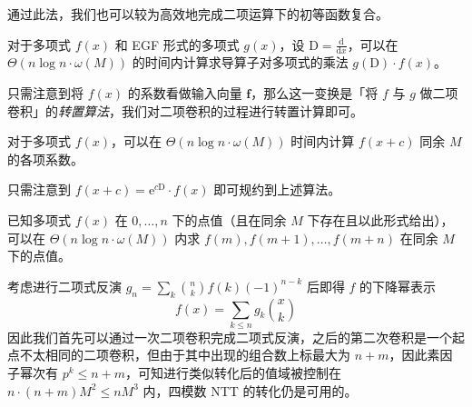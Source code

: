 通过此法，我们也可以较为高效地完成二项运算下的初等函数复合。

\begin{theorem}
对于多项式 $f(x)$ 和 EGF 形式的多项式 $g(x)$，设 $\mathrm{D} = \frac{\mathrm{d}}{\mathrm{d}x}$，可以在 $\Theta(n\log n \cdot \omega(M))$ 的时间内计算求导算子对多项式的乘法 $g(\mathrm{D}) \cdot f(x)$。
\end{theorem}

只需注意到将 $f(x)$ 的系数看做输入向量 $\mathbf f$，那么这一变换是「将 $f$ 与 $g$ 做二项卷积」的\emph{转置算法}，我们对二项卷积的过程进行转置计算即可。

\begin{lemma}
对于多项式 $f(x)$，可以在 $\Theta(n\log n \cdot \omega(M))$ 时间内计算 $f(x+c)$ 同余 $M$ 的各项系数。
\end{lemma}

只需注意到 $f(x+c) = \mathrm{e}^{c\mathrm{D}} \cdot f(x)$ 即可规约到上述算法。

\begin{lemma}
已知多项式 $f(x)$ 在 $0,\dots,n$ 下的点值（且在同余 $M$ 下存在且以此形式给出），可以在 $\Theta(n\log n \cdot \omega (M))$ 内求 $f(m),f(m+1),\dots,f(m+n)$ 在同余 $M$ 下的点值。
\end{lemma}

考虑进行二项式反演 $g_n = \sum_k \binom n k f(k)(-1)^{n-k}$ 后即得 $f$ 的下降幂表示
$$
f(x) = \sum_{k\le n} g_k \binom x k
$$
因此我们首先可以通过一次二项卷积完成二项式反演，之后的第二次卷积是一个起点不太相同的二项卷积，但由于其中出现的组合数上标最大为 $n+m$，因此素因子幂次有 $p^k\le n+m$，可知进行类似转化后的值域被控制在 $n\cdot (n+m)M^2\le nM^3$ 内，四模数 NTT 的转化仍是可用的。


